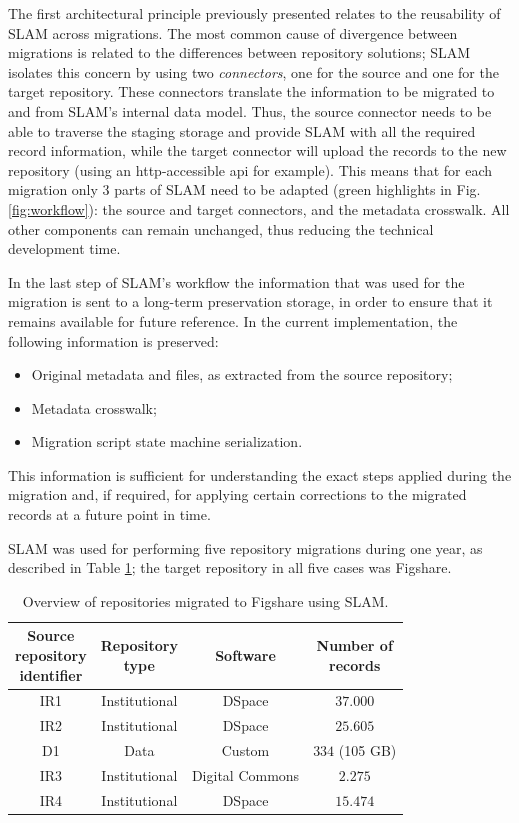 The first architectural principle previously presented relates to the reusability of SLAM across migrations. The most common cause of divergence between migrations is related to the differences between repository solutions; SLAM isolates this concern by using two \emph{connectors}, one for the source and one for the target repository. These connectors translate the information to be migrated to and from SLAM's internal data model. Thus, the source connector needs to be able to traverse the staging storage and provide SLAM with all the required record information, while the target connector will upload the records to the new repository (using an \gls{http}-accessible \gls{api} for example). This means that for each migration only 3 parts of SLAM need to be adapted (green highlights in Fig. \ref{fig:workflow}): the source and target connectors, and the metadata crosswalk. All other components can remain unchanged, thus reducing the technical development time.

In the last step of SLAM's workflow the information that was used for the migration is sent to a long-term preservation storage, in order to ensure that it remains available for future reference. In the current implementation, the following information is preserved:
\begin{itemize}
    \item Original metadata and files, as extracted from the source repository;
    \item Metadata crosswalk;
    \item Migration script state machine serialization.
\end{itemize}
This information is sufficient for understanding the exact steps applied during the migration and, if required, for applying certain corrections to the migrated records at a future point in time.

SLAM was used for performing five repository migrations during one year, as described in Table \ref{tbl:migrations}; the target repository in all five cases was Figshare. 
\begin{table}[thpb]
\centering
\begin{tabular}{|c||c|c|c|}
\hline
\specialcell{Source\\repository\\identifier} & \specialcell{Repository\\type} & Software & \specialcell{Number of\\records}\\ 
\hline\hline
IR1 & Institutional & DSpace & $37.000$ \\ \hline
IR2 & Institutional & DSpace & $25.605$ \\ \hline
D1 & Data & Custom & $334$ (105 GB) \\ \hline
IR3 & Institutional & Digital Commons & $2.275$ \\ \hline
IR4 & Institutional & DSpace & $15.474$ \\ \hline
\end{tabular}
\caption{Overview of repositories migrated to Figshare using SLAM.}
\label{tbl:migrations}
\end{table}

